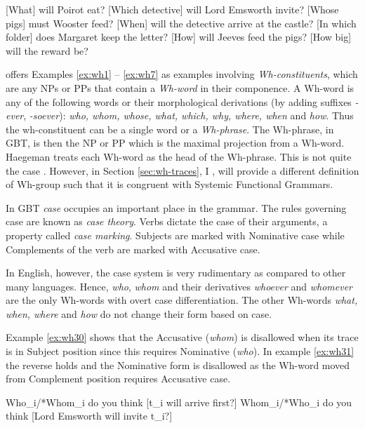 \begin{exe}
	\ex\label{ex:wh1} [What] will Poirot eat?
	\ex\label{ex:wh2} [Which detective] will Lord Emsworth invite?
	\ex\label{ex:wh3} [Whose pigs] must Wooster feed?
	\ex\label{ex:wh4} [When] will the detective arrive at the castle?
	\ex\label{ex:wh5} [In which folder] does Margaret keep the letter?
	\ex\label{ex:wh6} [How] will Jeeves feed the pigs? 
	\ex\label{ex:wh7} [How big] will the reward be?
\end{exe}

    \citet[375]{Haegeman1991} offers Examples \ref{ex:wh1} -- \ref{ex:wh7} as examples involving \textit{Wh-constituents}, which are any NPs or PPs that contain a \textit{Wh-word} in their componence. A Wh-word is any of the following words or their morphological derivations (by adding suffixes \textit{-ever}, \textit{-soever}): \textit{who, whom, whose, what, which, why, where, when} and \textit{how}. Thus the wh-constituent can be a single word or a \textit{Wh-phrase}. The Wh-phrase, in GBT, is then the NP or PP which is the maximal projection from a Wh-word. Haegeman treats each Wh-word as the head of the Wh-phrase. This is not quite the case . However, in Section \ref{sec:wh-traces}, I , will provide a different definition of Wh-group such that it is congruent with Systemic Functional Grammars.

    In GBT \textit{case} occupies an important place in the grammar. The rules governing case are known as \textit{case theory}. Verbs dictate the case of their arguments, a property called \textit{case marking}. Subjects are marked with Nominative case while Complements of the verb are marked with Accusative case. 

    In English, however, the case system is very rudimentary as compared to other many languages. Hence, \textit{who}, \textit{whom} and their derivatives \textit{whoever} and \textit{whomever} are the only Wh-words with overt case differentiation. The other Wh-words \textit{what, when, where} and \textit{how} do not change their form based on case. 

    Example \ref{ex:wh30} shows that the Accusative (\textit{whom}) is disallowed when its trace is in Subject position since this requires Nominative (\textit{who}). In example \ref{ex:wh31} the reverse holds and the Nominative form is disallowed as the Wh-word moved from Complement position requires Accusative case. 

    \begin{exe}
    	\ex\label{ex:wh30} Who_{i}/*Whom_{i} do you think [t_{i} will arrive first?]
    	\ex\label{ex:wh31} Whom_{i}/*Who_{i} do you think [Lord Emsworth will invite t_{i}?]
    \end{exe}


